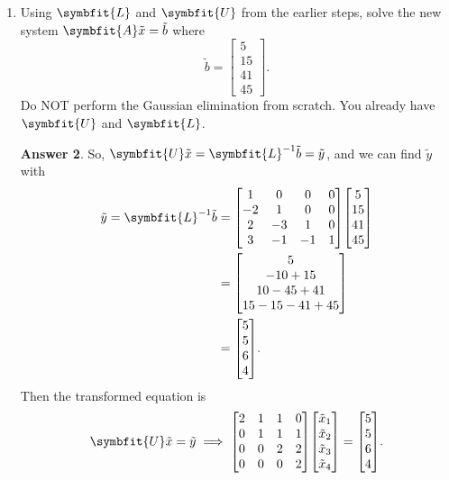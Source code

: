 \documentclass{article}
\theoremstyle{definition}
\newtheorem*{answer}{Answer}
\newcommand{\mat}[1]{\symbfit{#1}}
\begin{document}
\begin{enumerate}[leftmargin=\labelsep]
\begin{enumerate}
\begin{answer}
\[			            \]
			            Starting at the bottom, clearly \(x_4 = 1\). Then we have \(2x_3+2x_4=4\implies 2x_3+2=4\implies x_3=1\). Then we have \(x_2+x_3+x_4=3\implies x_2+1+1=3\implies x_2=1\). Finally, we have \(2x_1+x_2+x_3=4\implies 2x_1 + 1+1 =4\implies x_1 = 1\).
			            So,
			            \[
				            \boxed{\vec{x} = \mqty[1\\1\\1\\1]}	.
			            \]
		            \end{answer}

		      \item Using \(\mat{L}\) and \(\mat{U}\) from the earlier steps, solve the new system \(\mat{A}\tilde{x} = \tilde{b}\) where
		            \[
			            \tilde{b} =
			            \begin{bmatrix}
				            5 \\ 15 \\ 41 \\ 45
			            \end{bmatrix}.
		            \]
		            Do NOT perform the Gaussian elimination from scratch. You already have \(\mat{U}\) and \(\mat{L}\).
		            \begin{answer}
			            So, \(\mat{U}\tilde{x}=\mat{L}^{-1}\tilde{b}=\tilde{y}\), and we can find \(\tilde{y}\) with
			            \begin{align*}
				            \tilde{y}=\mat{L}^{-1}\tilde{b} & = \mqty[1 & 0 & 0 & 0 \\-2 & 1 & 0 & 0\\2 & -3 & 1 & 0\\3 & -1 & -1 & 1]\mqty[5 \\ 15 \\ 41 \\ 45] \\
				                                            & =\mqty[5              \\-10+15\\10-45+41\\15-15-41+45] \\
				                                            & = \mqty[5             \\5\\6\\4].
			            \end{align*}
			            Then the transformed equation is
			            \[
				            \mat{U}\tilde{x}=\tilde{y} \implies \mqty[2&1&1&0\\0&1&1&1\\0&0&2&2\\0&0&0&2] \mqty[\tilde{x}_1\\\tilde{x}_2\\\tilde{x}_3\\\tilde{x}_4] = \mqty[5\\5\\6\\4].
\]
\end{answer}
\end{enumerate}
\end{enumerate}
\end{document}
